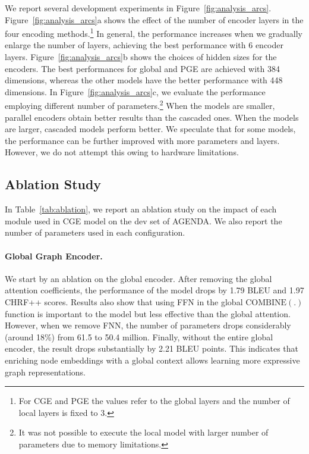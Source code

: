 \documentclass[11pt,a4paper]{article}
\begin{document}
We report several development experiments in Figure~\ref{fig:analysis_arcs}. Figure~\ref{fig:analysis_arcs}a shows the effect of the number of encoder layers in the four encoding methods.\footnote{For {\selectfont CGE} and {\selectfont PGE} the values refer to the global layers and the number of local layers is fixed to 3.}  In general, the performance increases when we gradually enlarge the number of layers, achieving the best performance with 6 encoder layers. Figure~\ref{fig:analysis_arcs}b shows the choices of hidden sizes for the encoders. The best performances for global and {\selectfont PGE} are achieved with 384 dimensions, whereas the other models have the better performance with 448 dimensions. In Figure~\ref{fig:analysis_arcs}c, we evaluate the performance employing different number of parameters.\footnote{It was not possible to execute the local model with larger number of parameters due to memory limitations.} When the models are smaller, parallel encoders obtain better results than the cascaded ones. When the models are larger, cascaded models perform better. We speculate that for some models, the performance can be further improved with more parameters and layers. However, we do not attempt this owing to hardware limitations.



\subsection{Ablation Study} In Table~\ref{tab:ablation}, we report an ablation study on the impact of each module used in {\selectfont CGE} model on the dev set of AGENDA. We also report the number of parameters used in each configuration. 
\paragraph{Global Graph Encoder.} We start by an ablation on the global encoder. After removing the global attention coefficients, the performance of the model drops by 1.79 BLEU and 1.97 CHRF++ scores. Results also show that using FFN in the global $\textrm{COMBINE}(.)$ function is important to the model but less effective than the global attention. However, when we remove FNN, the number of parameters drops considerably (around 18\%) from 61.5 to 50.4 million. Finally, without the entire global encoder, the result drops substantially by 2.21 BLEU points. This indicates that enriching node embeddings with a global context allows learning more expressive graph representations.
\end{document}
